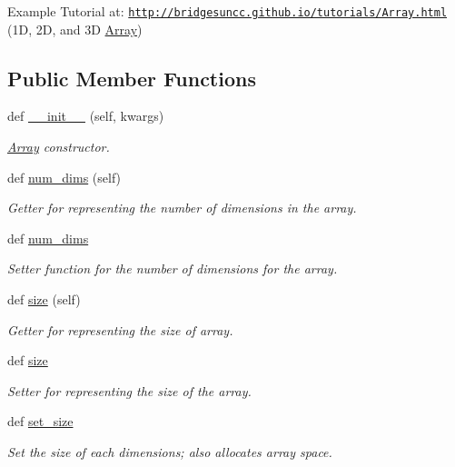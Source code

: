 Example Tutorial at\+: \href{http://bridgesuncc.github.io/tutorials/Array.html}{\tt http\+://bridgesuncc.\+github.\+io/tutorials/\+Array.\+html} (1D, 2D, and 3D \mbox{\hyperlink{classbridges_1_1array_1_1_array}{Array}}) \subsection*{Public Member Functions}
\begin{DoxyCompactItemize}
\item 
def \mbox{\hyperlink{classbridges_1_1array_1_1_array_ac772cbf7ad482b235e30929c8e1063a4}{\+\_\+\+\_\+init\+\_\+\+\_\+}} (self, kwargs)
\begin{DoxyCompactList}\small\item\em \mbox{\hyperlink{classbridges_1_1array_1_1_array}{Array}} constructor. \end{DoxyCompactList}\item 
def \mbox{\hyperlink{classbridges_1_1array_1_1_array_aaef2013f0e3befd61c0497638f409bc8}{num\+\_\+dims}} (self)
\begin{DoxyCompactList}\small\item\em Getter for representing the number of dimensions in the array. \end{DoxyCompactList}\item 
def \mbox{\hyperlink{classbridges_1_1array_1_1_array_ab7374f0d4bb0a9514b4af29bdd8935a5}{num\+\_\+dims}}
\begin{DoxyCompactList}\small\item\em Setter function for the number of dimensions for the array. \end{DoxyCompactList}\item 
def \mbox{\hyperlink{classbridges_1_1array_1_1_array_a01292e2099a89d0927855c25aedc8662}{size}} (self)
\begin{DoxyCompactList}\small\item\em Getter for representing the size of array. \end{DoxyCompactList}\item 
def \mbox{\hyperlink{classbridges_1_1array_1_1_array_a28cc9cbafb4e0d0fbfe22c12d1717351}{size}}
\begin{DoxyCompactList}\small\item\em Setter for representing the size of the array. \end{DoxyCompactList}\item 
def \mbox{\hyperlink{classbridges_1_1array_1_1_array_a0f1ede3d78cfafe1202d28520096272e}{set\+\_\+size}}
\begin{DoxyCompactList}\small\item\em Set the size of each dimensions; also allocates array space. \end{DoxyCompactList}\item 

\end{DoxyCompactItemize}

